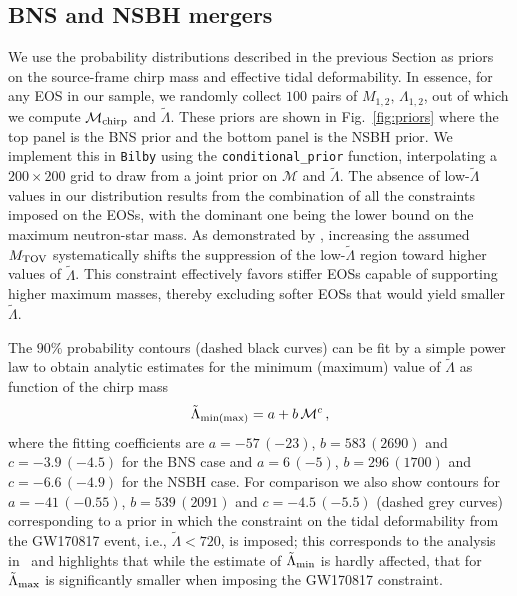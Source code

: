 \documentclass[twocolumn,linenumbers]{aastex631}
\begin{document}
\subsection{BNS and NSBH mergers}

We use the probability distributions described in the previous Section as
priors on the source-frame chirp mass and effective tidal deformability.
In essence, for any EOS in our sample, we randomly collect $100$
  pairs of $M_{1,2},\,\Lambda_{1,2}$, out of which we compute
  $\mathcal{M}_{\rm chirp}$ and ${\tilde \Lambda}$. These priors are
shown in Fig.~\ref{fig:priors} where the top panel is the BNS prior and
the bottom panel is the NSBH prior. We implement this in \texttt{Bilby}
using the \texttt{conditional\_prior} function, interpolating a
$200\times200$ grid to draw from a joint prior on $\mathcal{M}$ and
$\tilde{\Lambda}$.  The absence of low-$\tilde{\Lambda}$ values in
  our distribution results from the combination of all the constraints
  imposed on the EOSs, with the dominant one being the lower bound on the
  maximum neutron-star mass. As demonstrated by \citet{Ecker:2022dlg},
  increasing the assumed $M_{\rm TOV}$ systematically shifts the
  suppression of the low-$\tilde{\Lambda}$ region toward higher values of
  $\tilde{\Lambda}$. This constraint effectively favors stiffer EOSs
  capable of supporting higher maximum masses, thereby excluding softer
  EOSs that would yield smaller $\tilde{\Lambda}$.

The $90\%$ probability contours (dashed black curves) can be fit by a
simple power law to obtain analytic estimates for the minimum
  (maximum) value of $\tilde{\Lambda}$ as function of the chirp mass
%
\begin{equation}\label{eq:fit}
  \tilde\Lambda_{{\rm min}(\rm max)}=a + b \,\mathcal{M}^c\,,
\end{equation}
%
where the fitting coefficients are $a=-57\,(-23)$, $b=583\,(2690)$ and
$c=-3.9\,(-4.5)$ for the BNS case and $a=6\,(-5)$, $b=296\,(1700)$ and
$c=-6.6\,(-4.9)$ for the NSBH case. For comparison we also show contours
for $a=-41\,(-0.55)$, $b=539\,(2091)$ and $c=-4.5\,(-5.5)$ (dashed grey
curves) corresponding to a prior in which the constraint on the tidal
deformability from the GW170817 event, i.e., $\tilde{\Lambda} < 720$, is
imposed; this corresponds to the analysis in~\citet{Altiparmak:2022} and
highlights that while the estimate of $\tilde\Lambda_{\rm min}$ is hardly
affected, that for $\tilde\Lambda_{\rm max}$ is significantly smaller
when imposing the GW170817 constraint.
\end{document}
